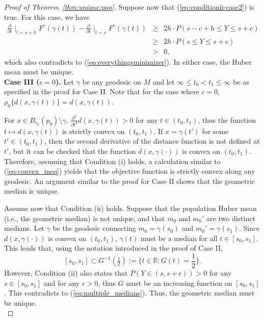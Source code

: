 \documentclass[preprint]{imsart}
\theoremstyle{plain}
\theoremstyle{remark}
\begin{document}
\begin{appendix}
\begin{proof}[Proof of Theorem~\ref{thm:unique:pop}]
Suppose now that (\ref{eq:conditionii-case2}) is true. For this case, we have  
\begin{eqnarray*}
\frac{\partial}{\partial t}\mid_{t = s+h} F^c(\gamma(t)) - \frac{\partial}{\partial t}\mid_{t = s} F^c(\gamma(t)) &\ge& 2h \cdot P( s-c +h \le Y \le s+c ) \\
&\ge& 2h \cdot P(s \le Y \le s+c) \\
&>& 0,
\end{eqnarray*}which also contradicts to (\ref{eq:everythingsminimizer}). In either case, the Huber mean must be unique. \\  


\textbf{Case III ($c  = 0$).} 
Let $\gamma$ be any geodesic on $M$ and let $\infty \le t_0 < t_1 \le \infty$ be as specified in the proof for Case II. 
Note that for the case where $c = 0$, $\rho_0 \{d(x, \gamma(t))\} = d(x,\gamma(t))$.



For $x \in B_{r_0}(p_0) \setminus \gamma$,
$\tfrac{\partial^2}{\partial t^2} d(x, \gamma(t)) > 0$ for any $t \in (t_0,t_1)$, thus 
the function $t \mapsto d(x,\gamma(t))$ is strictly convex on $ (t_0,t_1)$. If $x = \gamma(t')$ for some $t' \in (t_0,t_1)$, then 
the second derivative of the distance function is not defined at $t'$, but it can be checked that the function $d(x,\gamma(\cdot))$ is convex on $ (t_0,t_1)$. Therefore, assuming that Condition (i) holds, a calculation similar to  (\ref{eq:convex_ineq}) yields that the objective function is strictly convex along any geodesic. An argument similar to the proof for Case II shows that the geometric median is unique. 

% 

Assume now that Condition (ii) holds. Suppose that the population Huber mean (i.e., the geometric median) is not unique, and that $m_0$ and $m_0'$ are two distinct medians. Let $\gamma$ be the geodesic connecting $m_0 = \gamma(s_0)$ and $m_0' = \gamma(s_1)$. Since $d(x,\gamma(\cdot))$ is convex on $ (t_0,t_1)$, $\gamma(t)$ must be a median for all $t \in [s_0,s_1]$. 
This leads that, 
using the notation introduced in the proof of Case II, 
\begin{equation}
    \label{eq:multiple_medians}
    [s_0, s_1] \subset G^{-1}(\tfrac{1}{2}) := \{t \in \mathbb{R}: G(t) = \frac{1}{2}\}.
\end{equation} 
However, Condition (ii) also states that $P(Y \in (s,s+\epsilon)) > 0$ for any $s \in [s_0,s_1]$ and for any $\epsilon>0$, thus $G$ must be an increasing function on $[s_0, s_1]$. This contradicts to (\ref{eq:multiple_medians}). Thus, the geometric median must be unique.\\ 




\end{proof}
\end{appendix}
\end{document}

